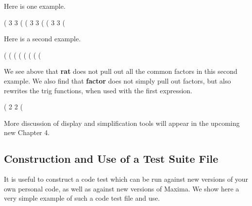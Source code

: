 \documentclass[11pt]{article}
\begin{document}
\noindent Here is one example.
\begin{myVerbatim}
(%
                                3            3
(%
(%
                               3          3
(%
(%
                                3          3
(%
\end{myVerbatim}
Here is a second example.
\begin{myVerbatim}
(%
(%
(%
(%
(%
(%
(%
(%
\end{myVerbatim}
We see above that \textbf{rat} does not pull out all the common factors in
  this second example.
We also find that \textbf{factor} does not simply pull out factors, but also
  rewrites the trig functions, when used with the first expression.
\begin{myVerbatim}
(%
                                 2                            2
(%
\end{myVerbatim}
More discussion of display and simplification tools will appear in the
  upcoming new Chapter 4.
\newpage
\subsection{Construction and Use of a Test Suite File}
It is useful to construct a code test which can be run against new versions of
  your own personal code, as well as against new versions of Maxima.
We show here a very simple example of such a code test file and use.\\
\end{document}
